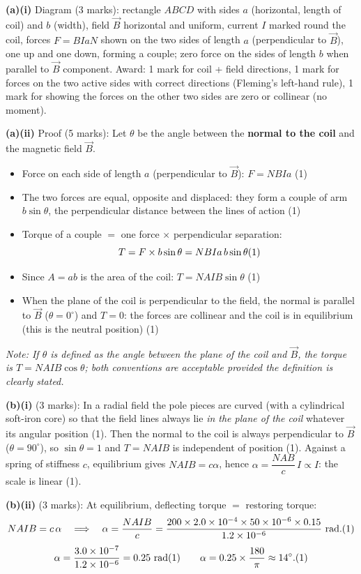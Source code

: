\documentclass[11pt]{article}
\begin{document}
\begin{corrige}
\textbf{(a)(i)} Diagram (3 marks): rectangle $ABCD$ with sides $a$ (horizontal, length of coil) and $b$ (width), field $\vec{B}$ horizontal and uniform, current $I$ marked round the coil, forces $F = B I a N$ shown on the two sides of length $a$ (perpendicular to $\vec{B}$), one up and one down, forming a couple; zero force on the sides of length $b$ when parallel to $\vec{B}$ component. Award: 1 mark for coil + field directions, 1 mark for forces on the two active sides with correct directions (Fleming's left-hand rule), 1 mark for showing the forces on the other two sides are zero or collinear (no moment).

\textbf{(a)(ii)} Proof (5 marks):
Let $\theta$ be the angle between the \textbf{normal to the coil} and the magnetic field $\vec{B}$.
\begin{itemize}
\item Force on each side of length $a$ (perpendicular to $\vec{B}$): $F = N B I a$ \hfill (1)
\item The two forces are equal, opposite and displaced: they form a couple of arm $b\sin\theta$, the perpendicular distance between the lines of action \hfill (1)
\item Torque of a couple $=$ one force $\times$ perpendicular separation:
\[ T = F \times b\sin\theta = N B I a\, b \sin\theta \hfill (1) \]
\item Since $A = ab$ is the area of the coil: $\boxed{T = N A I B \sin\theta}$ \hfill (1)
\item When the plane of the coil is perpendicular to the field, the normal is parallel to $\vec{B}$ ($\theta = 0^\circ$) and $T = 0$: the forces are collinear and the coil is in equilibrium (this is the neutral position) \hfill (1)
\end{itemize}
\textit{Note: If $\theta$ is defined as the angle between the \emph{plane of the coil} and $\vec{B}$, the torque is $T = N A I B \cos\theta$; both conventions are acceptable provided the definition is clearly stated.}

\textbf{(b)(i)} (3 marks): In a radial field the pole pieces are curved (with a cylindrical soft-iron core) so that the field lines always lie \emph{in the plane of the coil} whatever its angular position \hfill (1). Then the normal to the coil is always perpendicular to $\vec{B}$ ($\theta = 90^\circ$), so $\sin\theta = 1$ and $T = N A I B$ is independent of position \hfill (1). Against a spring of stiffness $c$, equilibrium gives $N A I B = c\alpha$, hence $\alpha = \dfrac{NAB}{c}\,I \propto I$: the scale is linear \hfill (1).

\textbf{(b)(ii)} (3 marks): At equilibrium, deflecting torque $=$ restoring torque:
\[ N A I B = c\,\alpha \quad\Longrightarrow\quad \alpha = \frac{N A I B}{c} = \frac{200 \times 2.0 \times 10^{-4} \times 50 \times 10^{-6} \times 0.15}{1.2 \times 10^{-6}}\ \mathrm{rad}. \hfill (1) \]
\[ \alpha = \frac{3.0 \times 10^{-7}}{1.2 \times 10^{-6}} = 0.25\ \mathrm{rad} \hfill (1) \qquad \alpha = 0.25 \times \frac{180}{\pi} \approx 14^\circ. \hfill (1) \]
\end{corrige}
\end{document}
